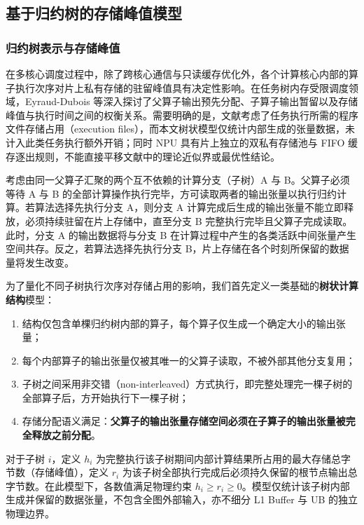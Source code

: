 \documentclass[anonymous,withtoc]{gmcm2026}
\providecommand{\tightlist}{\setlength{\itemsep}{0pt}\setlength{\parskip}{0pt}}
\begin{document}
\subsection{基于归约树的存储峰值模型}

\subsubsection{归约树表示与存储峰值}

在多核心调度过程中，除了跨核心通信与只读缓存优化外，各个计算核心内部的算子执行次序对片上私有存储的驻留峰值具有决定性影响。在任务树内存受限调度领域，Eyraud-Dubois 等\cite{ref21}深入探讨了父算子输出预先分配、子算子输出暂留以及存储峰值与执行时间之间的权衡关系。需要明确的是，文献\cite{ref21}考虑了任务执行所需的程序文件存储占用（execution files），而本文树状模型仅统计内部生成的张量数据，未计入此类任务执行额外开销；同时 NPU 具有片上独立的双私有存储池与 FIFO 缓存逐出规则，不能直接平移文献\cite{ref21}中的理论近似界或最优性结论。

考虑由同一父算子汇聚的两个互不依赖的计算分支（子树）A 与 B。父算子必须等待 A 与 B 的全部计算操作执行完毕，方可读取两者的输出张量以执行归约计算。若算法选择先执行分支 A，则分支 A 计算完成后生成的输出张量不能立即释放，必须持续驻留在片上存储中，直至分支 B 完整执行完毕且父算子完成读取。此时，分支 A 的输出数据将与分支 B 在计算过程中产生的各类活跃中间张量产生空间共存。反之，若算法选择先执行分支 B，片上存储在各个时刻所保留的数据量将发生改变。

为了量化不同子树执行次序对存储占用的影响，我们首先定义一类基础的\textbf{树状计算结构}模型：

\begin{enumerate}
\def\labelenumi{\arabic{enumi}.}
\tightlist
\item
  结构仅包含单棵归约树内部的算子，每个算子仅生成一个确定大小的输出张量；
\item
  每个内部算子的输出张量仅被其唯一的父算子读取，不被外部其他分支复用；
\item
  子树之间采用非交错（non-interleaved）方式执行，即完整处理完一棵子树的全部算子后，方开始执行下一棵子树；
\item
  存储分配语义满足：\textbf{父算子的输出张量存储空间必须在子算子的输出张量被完全释放之前分配}。
\end{enumerate}

对于子树 \(i\)，定义 \(h_i\) 为完整执行该子树期间内部计算结果所占用的最大存储总字节数（存储峰值），定义 \(r_i\) 为该子树全部执行完成后必须持久保留的根节点输出总字节数。在此模型下，各数值满足物理约束 \(h_i \ge r_i \ge 0\)。模型仅统计该子树内部生成并保留的数据张量，不包含全图外部输入，亦不细分 L1 Buffer 与 UB 的独立物理边界。
\end{document}
